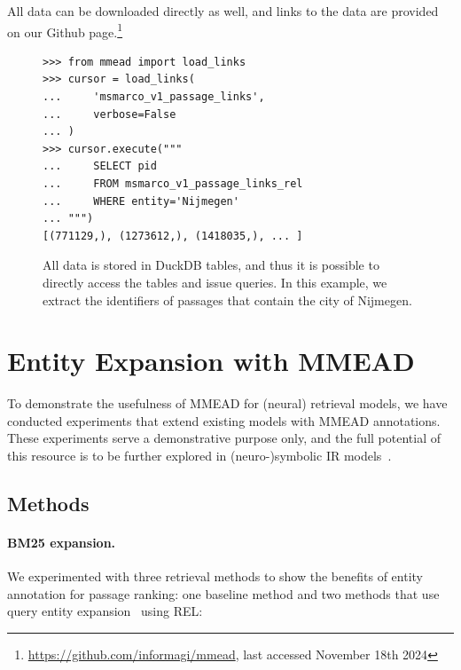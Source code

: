All data can be downloaded directly as well, and links to the data are provided on our Github page.\footnote{\url{https://github.com/informagi/mmead}, last accessed November 18th 2024}

\begin{figure}
	\begin{verbatim}
>>> from mmead import load_links
>>> cursor = load_links(
...     'msmarco_v1_passage_links',
...     verbose=False
... )
>>> cursor.execute("""
...     SELECT pid 
...     FROM msmarco_v1_passage_links_rel 
...     WHERE entity='Nijmegen'
... """)
[(771129,), (1273612,), (1418035,), ... ]
	\end{verbatim}
	\caption{All data is stored in DuckDB tables, and thus it is possible to directly access the tables and issue queries. In this example, we extract the identifiers of passages that contain the city of Nijmegen.}
	\label{fig:sql_engine}
\end{figure}

\section{Entity Expansion with MMEAD}
To demonstrate the usefulness of MMEAD for (neural) retrieval models, we have conducted experiments that extend existing models with MMEAD annotations.
These experiments serve a demonstrative purpose only, and the full potential of this resource is to be further explored in (neuro-)symbolic IR models~\citep{Gerritse:2022:EMBERT,Tran:2022:DRE}.

\subsection{Methods}

\paragraph{BM25 expansion.} We experimented with three retrieval methods to show the benefits of entity annotation for passage ranking: one baseline method and two methods that use query entity expansion~\citep{Shehata} using REL:

